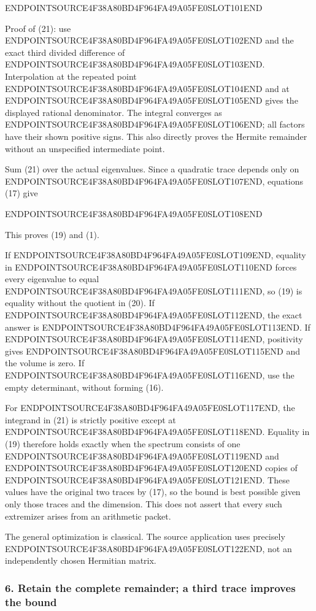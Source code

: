ENDPOINTSOURCE4F38A80BD4F964FA49A05FE0SLOT101END

Proof of (21): use ENDPOINTSOURCE4F38A80BD4F964FA49A05FE0SLOT102END and the exact third divided difference of ENDPOINTSOURCE4F38A80BD4F964FA49A05FE0SLOT103END. Interpolation at the repeated point ENDPOINTSOURCE4F38A80BD4F964FA49A05FE0SLOT104END and at ENDPOINTSOURCE4F38A80BD4F964FA49A05FE0SLOT105END gives the displayed rational denominator. The integral converges as ENDPOINTSOURCE4F38A80BD4F964FA49A05FE0SLOT106END; all factors have their shown positive signs. This also directly proves the Hermite remainder without an unspecified intermediate point.

Sum (21) over the actual eigenvalues. Since a quadratic trace depends only on ENDPOINTSOURCE4F38A80BD4F964FA49A05FE0SLOT107END, equations (17) give

ENDPOINTSOURCE4F38A80BD4F964FA49A05FE0SLOT108END

This proves (19) and (1).

If ENDPOINTSOURCE4F38A80BD4F964FA49A05FE0SLOT109END, equality in ENDPOINTSOURCE4F38A80BD4F964FA49A05FE0SLOT110END forces every eigenvalue to equal ENDPOINTSOURCE4F38A80BD4F964FA49A05FE0SLOT111END, so (19) is equality without the quotient in (20). If ENDPOINTSOURCE4F38A80BD4F964FA49A05FE0SLOT112END, the exact answer is ENDPOINTSOURCE4F38A80BD4F964FA49A05FE0SLOT113END. If ENDPOINTSOURCE4F38A80BD4F964FA49A05FE0SLOT114END, positivity gives ENDPOINTSOURCE4F38A80BD4F964FA49A05FE0SLOT115END and the volume is zero. If ENDPOINTSOURCE4F38A80BD4F964FA49A05FE0SLOT116END, use the empty determinant, without forming (16).

For ENDPOINTSOURCE4F38A80BD4F964FA49A05FE0SLOT117END, the integrand in (21) is strictly positive except at ENDPOINTSOURCE4F38A80BD4F964FA49A05FE0SLOT118END. Equality in (19) therefore holds exactly when the spectrum consists of one ENDPOINTSOURCE4F38A80BD4F964FA49A05FE0SLOT119END and ENDPOINTSOURCE4F38A80BD4F964FA49A05FE0SLOT120END copies of ENDPOINTSOURCE4F38A80BD4F964FA49A05FE0SLOT121END. These values have the original two traces by (17), so the bound is best possible given only those traces and the dimension. This does not assert that every such extremizer arises from an arithmetic packet.

The general optimization is classical. The source application uses precisely ENDPOINTSOURCE4F38A80BD4F964FA49A05FE0SLOT122END, not an independently chosen Hermitian matrix.

\subsubsection{6. Retain the complete remainder; a third trace improves the bound}\label{endpoint-relation_moment_original--retain-the-complete-remainder-a-third-trace-improves-the-bound}

